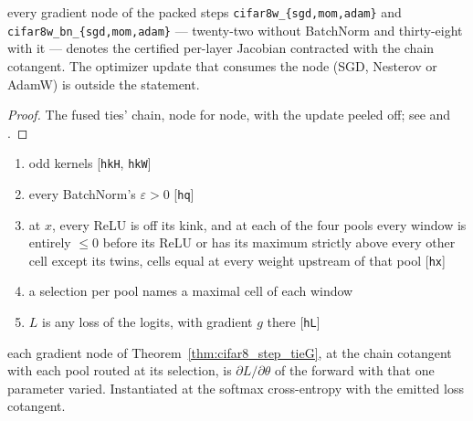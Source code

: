 \begin{theorem}
  \label{thm:cifar8_step_tieG}
  \leanok
  \Prove{} every gradient node of the packed steps
  \texttt{cifar8w\_\{sgd,mom,adam\}} and \texttt{cifar8w\_bn\_\{sgd,mom,adam\}}
  --- twenty-two without BatchNorm and thirty-eight with it --- denotes the
  certified per-layer Jacobian contracted with the chain cotangent. The
  optimizer update that consumes the node (SGD, Nesterov or AdamW) is
  outside the statement.
\end{theorem}

\begin{proof}
\leanok
The fused ties' chain, node for node, with the update peeled off; see
 and
.
\end{proof}

\begin{theorem}
  \label{thm:cifar8_loss_grad}
  \leanok
  \Assume{}
  \begin{enumerate}
    \item odd kernels \hfill[\texttt{hkH}, \texttt{hkW}]
    \item every BatchNorm's \(\varepsilon > 0\) \hfill[\texttt{hq}]
    \item at \(x\), every ReLU is off its kink, and at each of the four pools
          every window is entirely \(\le 0\) before its ReLU or has its
          maximum strictly above every other cell except its twins, cells
          equal at every weight upstream of that pool \hfill[\texttt{hx}]
    \item a selection per pool names a maximal cell of each window
    \item \(L\) is any loss of the logits, with gradient \(g\) there
          \hfill[\texttt{hL}]
  \end{enumerate}
  \Prove{} each gradient node of Theorem~\ref{thm:cifar8_step_tieG}, at the
  chain cotangent with each pool routed at its selection, is
  \(\partial L/\partial\theta\) of the forward with that one parameter
  varied. Instantiated at the softmax cross-entropy with the emitted loss
  cotangent.
\end{theorem}

